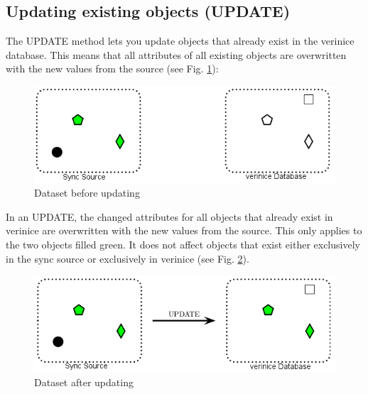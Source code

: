 \documentclass[a4paper,10pt]{book}
\begin{document}
\subsection{Updating existing objects (UPDATE)}
The UPDATE method lets you update objects that already exist in the verinice database. This means that all attributes of all
existing objects are overwritten with the new values from the source (see Fig. \ref{Dataset before updating}):
\newline
\begin{figure}[htb!]
  \centering
  \includegraphics[scale=.7]{Screenshot/SyncAPI_pre_UPDATE-en.png}
  \caption{\label{Dataset before updating} Dataset before updating}
\end{figure}
\newline
In an \textsc{UPDATE}, the changed attributes for all objects that already exist in verinice are overwritten with
the new values from the source. This only applies to the two objects filled green. It does not affect objects
that exist either exclusively in the sync source or exclusively in verinice (see Fig. \ref{Dataset after updating}).
\begin{figure}[htb!]
  \centering
  \includegraphics[scale=.7]{Screenshot/SyncAPI_post_UPDATE-en.png}
  \caption{\label{Dataset after updating} Dataset after updating}
\end{figure}
\newline
\end{document}
